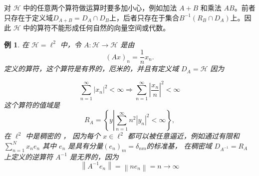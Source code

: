 \documentclass[hyperref,UTF8]{ctexbook}
\newtheorem{eg}{例}[chapter]
\begin{document}
对 \(\mathcal{H}\) 中的任意两个算符做运算时要多加小心，例如加法 \(A+B\) 和乘法 \(A B\)。前者只存在于定义域\(D_{A+B}=D_{A}\cap D_{B}\)上，后者只存在于集合\(B^{-1}\left(R_{ B} \cap D_{A}\right)\)上。因此 \(\mathcal{H}\) 中的算符不能形成任何自然的向量空间或代数。
\begin{eg}\label{eg:13.16}
    在 \(\mathcal{H}=\ell^{2}\) 中，令 \(A: \mathcal{H} \rightarrow \mathcal{H}\) 是由
\[
(A x)_{n}=\frac{1}{n} x_{n} .
\]
定义的算符，这个算符是有界的，厄米的，并且有定义域 \(D_{A}=\mathcal{H}\) 因为

\[
\sum_{n=1}^{\infty}\left|x_{n}\right|^{2}<\infty \Longrightarrow \sum_{n=1}^{\infty}\left|\frac{x_{n}}{n}\right|^{2}<\infty
\]
这个算符的值域是
\[
R_{A}=\left\{y\left|\sum_{n=1}^{\infty} n^{2}| y_{n}|^{2}<\infty\right.\right\},
\]
在 \(\ell^{2}\) 中是稠密的 ， 因为每个 \(x \in \ell^{2}\) 都可以被任意逼近，例如通过有限和\(\sum_{n=1}^{N} x_{n} e_{n}\) 其中 \(e_{n}\) 是具有分量\(\left(e_{n}\right)_{m}=\delta_{n m}\)的标准基，
在稠密域 \(D_{A^{-1}}=R_{A}\) 上定义的逆算符 \(A^{-1}\) 是无界的，因为
\[
\left\|A^{-1} e_{n}\right\|=\left\|n e_{n}\right\|=n \rightarrow \infty
\]    
\end{eg}
\end{document}
